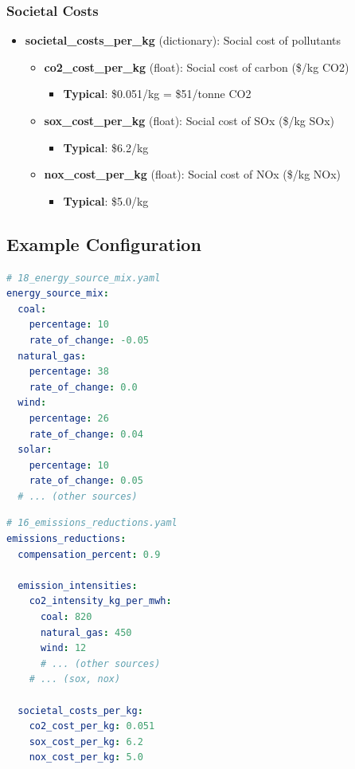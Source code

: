 \documentclass[ctcc_full_documentation.tex]{subfiles}
\begin{document}
\subsubsection{Societal Costs}

\begin{itemize}
    \item \textbf{societal\_costs\_per\_kg} (dictionary): Social cost of pollutants
    \begin{itemize}
        \item \textbf{co2\_cost\_per\_kg} (float): Social cost of carbon (\$/kg CO2)
        \begin{itemize}
            \item \textbf{Typical}: \$0.051/kg = \$51/tonne CO2
        \end{itemize}
        \item \textbf{sox\_cost\_per\_kg} (float): Social cost of SOx (\$/kg SOx)
        \begin{itemize}
            \item \textbf{Typical}: \$6.2/kg
        \end{itemize}
        \item \textbf{nox\_cost\_per\_kg} (float): Social cost of NOx (\$/kg NOx)
        \begin{itemize}
            \item \textbf{Typical}: \$5.0/kg
        \end{itemize}
    \end{itemize}
\end{itemize}

\subsection{Example Configuration}

\begin{lstlisting}[language=yaml]
# 18_energy_source_mix.yaml
energy_source_mix:
  coal:
    percentage: 10
    rate_of_change: -0.05
  natural_gas:
    percentage: 38
    rate_of_change: 0.0
  wind:
    percentage: 26
    rate_of_change: 0.04
  solar:
    percentage: 10
    rate_of_change: 0.05
  # ... (other sources)
\end{lstlisting}

\begin{lstlisting}[language=yaml]
# 16_emissions_reductions.yaml
emissions_reductions:
  compensation_percent: 0.9

  emission_intensities:
    co2_intensity_kg_per_mwh:
      coal: 820
      natural_gas: 450
      wind: 12
      # ... (other sources)
    # ... (sox, nox)

  societal_costs_per_kg:
    co2_cost_per_kg: 0.051
    sox_cost_per_kg: 6.2
    nox_cost_per_kg: 5.0
\end{lstlisting}
\end{document}
